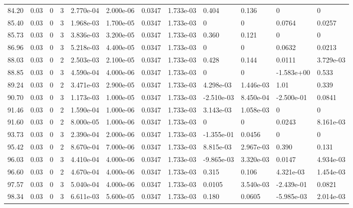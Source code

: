 \documentclass[preview]{standalone}
\begin{document}
{{{\begin{tabular}{L{1.2cm}C{1.2cm} C{0.3cm}C{0.5cm} C{1.4cm}C{1.4cm} C{1.4cm}C{1.4cm} C{1.6cm}C{1.6cm} C{1.6cm}C{1.6cm}}
  84.20  &  0.03  & 0     &  3 &  2.770e-04  & 2.000e-06  &  0.0347&   1.733e-03& 0.404 & 0.136   &  0 & 0  \\ 
  85.40  &  0.03  & 0     &  3 &  1.968e-03  & 1.700e-05  &  0.0347&   1.733e-03& 0 & 0   &  0.0764 & 0.0257  \\ 
  85.73  &  0.03  & 0     &  3 &  3.836e-03  & 3.200e-05  &  0.0347&   1.733e-03& 0.360 & 0.121   &  0 & 0  \\ 
  86.96  &  0.03  & 0     &  3 &  5.218e-03  & 4.400e-05  &  0.0347&   1.733e-03& 0 & 0   &  0.0632 & 0.0213  \\ 
  88.03  &  0.03  & 0     &  2 &  2.503e-03  & 2.100e-05  &  0.0347&   1.733e-03& 0.428 & 0.144   &  0.0111 & 3.729e-03  \\ 
  88.85  &  0.03  & 0     &  3 &  4.590e-04  & 4.000e-06  &  0.0347&   1.733e-03& 0 & 0   &  -1.583e+00 & 0.533  \\ 
  89.24  &  0.03  & 0     &  2 &  3.471e-03  & 2.900e-05  &  0.0347&   1.733e-03& 4.298e-03 & 1.446e-03   &  1.01 & 0.339  \\ 
  90.70  &  0.03  & 0     &  3 &  1.173e-03  & 1.000e-05  &  0.0347&   1.733e-03& -2.510e-03 & 8.450e-04   &  -2.500e-01 & 0.0841  \\ 
  91.46  &  0.03  & 0     &  2 &  1.590e-04  & 1.000e-06  &  0.0347&   1.733e-03& 3.143e-03 & 1.058e-03   &  0 & 0  \\ 
  91.60  &  0.03  & 0     &  2 &  8.000e-05  & 1.000e-06  &  0.0347&   1.733e-03& 0 & 0   &  0.0243 & 8.161e-03  \\ 
  93.73  &  0.03  & 0     &  3 &  2.390e-04  & 2.000e-06  &  0.0347&   1.733e-03& -1.355e-01 & 0.0456   &  0 & 0  \\ 
  95.42  &  0.03  & 0     &  2 &  8.670e-04  & 7.000e-06  &  0.0347&   1.733e-03& 8.815e-03 & 2.967e-03   &  0.390 & 0.131  \\ 
  96.03  &  0.03  & 0     &  3 &  4.410e-04  & 4.000e-06  &  0.0347&   1.733e-03& -9.865e-03 & 3.320e-03   &  0.0147 & 4.934e-03  \\ 
  96.60  &  0.03  & 0     &  2 &  4.670e-04  & 4.000e-06  &  0.0347&   1.733e-03& 0.315 & 0.106   &  4.321e-03 & 1.454e-03  \\ 
  97.57  &  0.03  & 0     &  3 &  5.040e-04  & 4.000e-06  &  0.0347&   1.733e-03& 0.0105 & 3.540e-03   &  -2.439e-01 & 0.0821  \\ 
  98.34  &  0.03  & 0     &  3 &  6.611e-03  & 5.600e-05  &  0.0347&   1.733e-03& 0.180 & 0.0605   &  -5.985e-03 & 2.014e-03  \\ 
\hline 
\end{tabular} 

}}}
\end{document}
